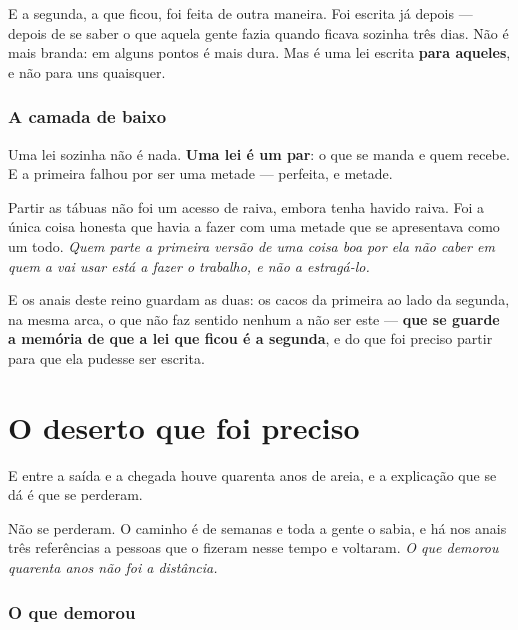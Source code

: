 \documentclass[livro.tex]{subfiles}
\begin{document}
\medskip

E a segunda, a que ficou, foi feita de outra maneira. Foi escrita já depois --- depois de se saber
o que aquela gente fazia quando ficava sozinha três dias. Não é mais branda: em alguns pontos é
mais dura. Mas é uma lei escrita \textbf{para aqueles}, e não para uns quaisquer.

\subsection*{A camada de baixo}

Uma lei sozinha não é nada. \textbf{Uma lei é um par}: o que se manda e quem recebe. E a primeira
falhou por ser uma metade --- perfeita, e metade.

\medskip

Partir as tábuas não foi um acesso de raiva, embora tenha havido raiva. Foi a única coisa
honesta que havia a fazer com uma metade que se apresentava como um todo. \emph{Quem parte a
primeira versão de uma coisa boa por ela não caber em quem a vai usar está a fazer o trabalho, e
não a estragá-lo.}

\medskip

E os anais deste reino guardam as duas: os cacos da primeira ao lado da segunda, na mesma arca, o
que não faz sentido nenhum a não ser este --- \textbf{que se guarde a memória de que a lei que
ficou é a segunda}, e do que foi preciso partir para que ela pudesse ser escrita.

\chapter{O deserto que foi preciso}

E entre a saída e a chegada houve quarenta anos de areia, e a explicação que se dá é que se
perderam.

\medskip

Não se perderam. O caminho é de semanas e toda a gente o sabia, e há nos anais três referências a
pessoas que o fizeram nesse tempo e voltaram. \emph{O que demorou quarenta anos não foi a
distância.}

\subsection*{O que demorou}
\end{document}
